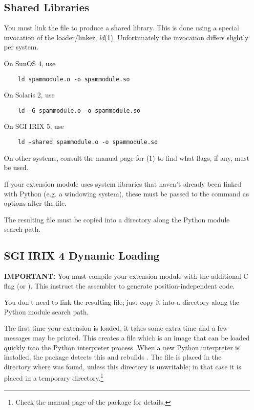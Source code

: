 \subsection{Shared Libraries}

You must link the  file to produce a shared library.  This is
done using a special invocation of the \UNIX{} loader/linker, {\em
ld}(1).  Unfortunately the invocation differs slightly per system.

On SunOS 4, use
\begin{verbatim}
    ld spammodule.o -o spammodule.so
\end{verbatim}

On Solaris 2, use
\begin{verbatim}
    ld -G spammodule.o -o spammodule.so
\end{verbatim}

On SGI IRIX 5, use
\begin{verbatim}
    ld -shared spammodule.o -o spammodule.so
\end{verbatim}

On other systems, consult the manual page for (1) to find what
flags, if any, must be used.

If your extension module uses system libraries that haven't already
been linked with Python (e.g. a windowing system), these must be
passed to the  command as  options after the
 file.

The resulting file  must be copied into a directory
along the Python module search path.


\subsection{SGI IRIX 4 Dynamic Loading}

{\bf IMPORTANT:} You must compile your extension module with the
additional C flag  (or ).  This instruct the
assembler to generate position-independent code.

You don't need to link the resulting  file; just
copy it into a directory along the Python module search path.

The first time your extension is loaded, it takes some extra time and
a few messages may be printed.  This creates a file
 which is an image that can be loaded quickly into
the Python interpreter process.  When a new Python interpreter is
installed, the  package detects this and rebuilds
.  The file  is placed in the
directory where  was found, unless this directory is
unwritable; in that case it is placed in a temporary
directory.\footnote{Check the manual page of the  package for
details.}

